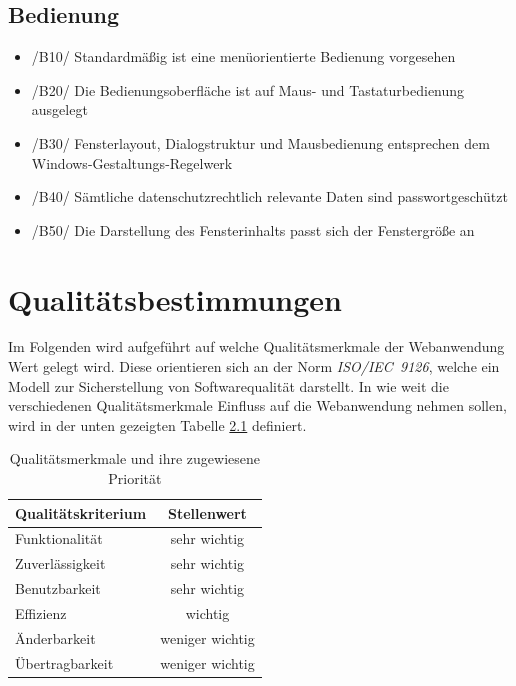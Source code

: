 \documentclass[a4paper]{scrreprt}
\begin{document}
    \section{Bedienung}       
	    \begin{itemize}
			\item /B10/ Standardmäßig ist eine menüorientierte Bedienung vorgesehen
			\item /B20/ Die Bedienungsoberfläche ist auf Maus- und Tastaturbedienung ausgelegt
			\item /B30/ Fensterlayout, Dialogstruktur und Mausbedienung entsprechen dem Windows-Gestaltungs-Regelwerk
			\item /B40/ Sämtliche datenschutzrechtlich relevante Daten sind passwortgeschützt
			\item /B50/ Die Darstellung des Fensterinhalts passt sich der Fenstergröße an
		\end{itemize}
            
            
         
\chapter{Qualitätsbestimmungen}
	Im Folgenden wird aufgeführt auf welche Qualitätsmerkmale der Webanwendung Wert gelegt wird. Diese orientieren sich an der Norm \textit{ISO/IEC~9126}, welche ein Modell zur Sicherstellung von Softwarequalität darstellt. In wie weit die verschiedenen Qualitätsmerkmale Einfluss auf die Webanwendung nehmen sollen, wird in der unten gezeigten Tabelle \ref{qTabelle} definiert.\\

	\begin{table}[h]
 
	    \begin{center}
		    \begin{tabular}{|l|c|}
			    \hline 
			    \rule[-1ex]{0pt}{2.5ex} \textbf{Qualitätskriterium} & \textbf{Stellenwert} \\ 
			    \hline 
			    \rule[-1ex]{0pt}{2.5ex} Funktionalität & sehr wichtig \\ 
			    \hline 
			    \rule[-1ex]{0pt}{2.5ex} Zuverlässigkeit & sehr wichtig \\ 
			    \hline 
			    \rule[-1ex]{0pt}{2.5ex} Benutzbarkeit & sehr wichtig \\ 
			    \hline 
			    \rule[-1ex]{0pt}{2.5ex} Effizienz & wichtig \\ 
			    \hline 
			    \rule[-1ex]{0pt}{2.5ex} Änderbarkeit & weniger wichtig \\ 
			    \hline 
			    \rule[-1ex]{0pt}{2.5ex} Übertragbarkeit & weniger wichtig \\ 
			    \hline   
		    \end{tabular}  
	    \end{center}
	    \caption{Qualitätsmerkmale und ihre zugewiesene Priorität} 
	    \label{qTabelle}   
	\end{table}
    
\end{document}
